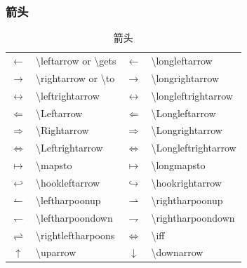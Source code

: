 \documentclass[a4paper]{ctexart}
\begin{document}
    \subsubsection{箭头}
    \begin{table}[H]
        \centering
        \caption{箭头}
        \begin{tabular}{clcl}
            $\leftarrow$            & \textbackslash leftarrow or  \textbackslash gets  & $\longleftarrow$            & \textbackslash longleftarrow        \\
            $\rightarrow$           & \textbackslash rightarrow or \textbackslash to    & $\longrightarrow$           & \textbackslash longrightarrow       \\
            $\leftrightarrow$       & \textbackslash leftrightarrow                     & $\longleftrightarrow$       & \textbackslash longleftrightarrow   \\
            $\Leftarrow$            & \textbackslash Leftarrow                          & $\Longleftarrow$            & \textbackslash Longleftarrow        \\
            $\Rightarrow$           & \textbackslash Rightarrow                         & $\Longrightarrow$           & \textbackslash Longrightarrow       \\
            $\Leftrightarrow$       & \textbackslash Leftrightarrow                     & $\Longleftrightarrow$       & \textbackslash Longleftrightarrow   \\
            $\mapsto$               & \textbackslash mapsto                             & $\longmapsto$               & \textbackslash longmapsto           \\
            $\hookleftarrow$        & \textbackslash hookleftarrow                      & $\hookrightarrow$           & \textbackslash hookrightarrow       \\
            $\leftharpoonup$        & \textbackslash leftharpoonup                      & $\rightharpoonup$           & \textbackslash rightharpoonup       \\
            $\leftharpoondown$      & \textbackslash leftharpoondown                    & $\rightharpoondown$         & \textbackslash rightharpoondown     \\
            $\rightleftharpoons$    & \textbackslash rightleftharpoons                  & $\iff$                      & \textbackslash iff                  \\
            $\uparrow$              & \textbackslash uparrow                            & $\downarrow$                & \textbackslash downarrow            \\

\end{tabular}
\end{table}
\end{document}
